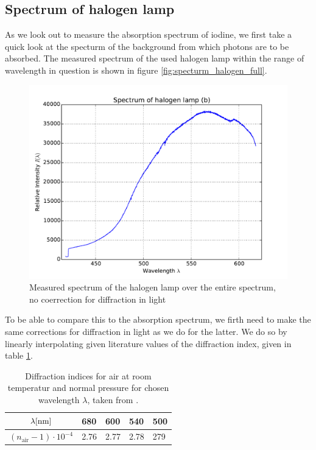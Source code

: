 \subsection{Spectrum of halogen lamp}
As we look out to measure the absorption spectrum of iodine, we first take a quick look at 
the specturm of the background from which photons are to be absorbed. The measured spectrum 
of the used halogen lamp within the range of wavelength in question is shown in figure 
\ref{fig:specturm_halogen_full}.
\begin{figure}
\centering
\includegraphics[width=\pltw]{analysis/figures/halogen_02.pdf}
\caption{Measured spectrum of the halogen lamp over the entire spectrum, no coerrection for 
diffraction in light}
\label{fig:spectrum_halogen_full}
\end{figure}
To be able to compare this to the absorption spectrum, we firth need to make the same 
corrections for diffraction in light as we do for the latter. We do so by linearly 
interpolating given literature values of the diffraction index, given in table 
\ref{tab:diff_air}.

\begin{table}[h]
\centering
\begin{tabular}{| c |l|l|l|l|}
\hline
$\lambda [\mathrm{nm}]$              & 680  & 600  & 540  & 500 \\ \hline
$(n_\mathrm{air} - 1) \cdot 10^{-4}$ & 2.76 & 2.77 & 2.78 & 279 \\ \hline
\end{tabular}
\caption{Diffraction indices for air at room temperatur and normal pressure for 
chosen wavelength $\lambda$, taken from \cite{}.}
\label{tab:diff_air}
\end{table}


